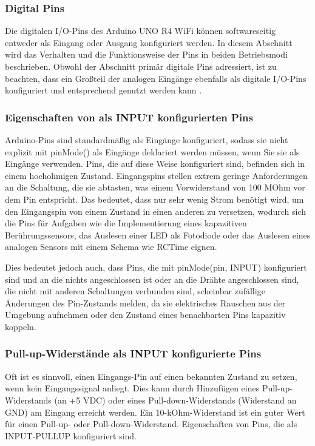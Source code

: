 \subsubsection{Digital Pins}
	Die digitalen I/O-Pins des Arduino UNO R4 WiFi können softwareseitig entweder als Eingang oder Ausgang konfiguriert werden. In diesem Abschnitt wird das Verhalten und die Funktionsweise der Pins in beiden Betriebsmodi beschrieben. Obwohl der Abschnitt primär digitale Pins adressiert, ist zu beachten, dass ein Großteil der analogen Eingänge ebenfalls als digitale I/O-Pins konfiguriert und entsprechend genutzt werden kann \cite{ArduinoPins:2026b}.
	
	
\subsubsection{Eigenschaften von als INPUT konfigurierten Pins}

Arduino-Pins sind standardmäßig als Eingänge konfiguriert, sodass sie nicht explizit mit pinMode() als Eingänge deklariert werden müssen, wenn Sie sie als Eingänge verwenden. Pins, die auf diese Weise konfiguriert sind, befinden sich in einem hochohmigen Zustand. Eingangspins stellen extrem geringe Anforderungen an die Schaltung, die sie abtasten, was einem Vorwiderstand von 100 MOhm vor dem Pin entspricht. Das bedeutet, dass nur sehr wenig Strom benötigt wird, um den Eingangspin von einem Zustand in einen anderen zu versetzen, wodurch sich die Pins für Aufgaben wie die Implementierung eines kapazitiven Berührungssensors, das Auslesen einer LED als Fotodiode oder das Auslesen eines analogen Sensors mit einem Schema wie RCTime eignen.

Dies bedeutet jedoch auch, dass Pins, die mit pinMode(pin, INPUT) konfiguriert sind und an die nichts angeschlossen ist oder an die Drähte angeschlossen sind, die nicht mit anderen Schaltungen verbunden sind, scheinbar zufällige Änderungen des Pin-Zustands melden, da sie elektrisches Rauschen aus der Umgebung aufnehmen oder den Zustand eines benachbarten Pins kapazitiv koppeln.


\subsubsection{Pull-up-Widerstände als INPUT konfigurierte Pins}

Oft ist es sinnvoll, einen Eingangs-Pin auf einen bekannten Zustand zu setzen, wenn kein Eingangssignal anliegt. Dies kann durch Hinzufügen eines Pull-up-Widerstands (an +5 VDC) oder eines Pull-down-Widerstands (Widerstand an GND) am Eingang erreicht werden. Ein 10-kOhm-Widerstand ist ein guter Wert für einen Pull-up- oder Pull-down-Widerstand.
Eigenschaften von Pins, die als INPUT-PULLUP konfiguriert sind.\cite{ArduinoPins:2026b}

